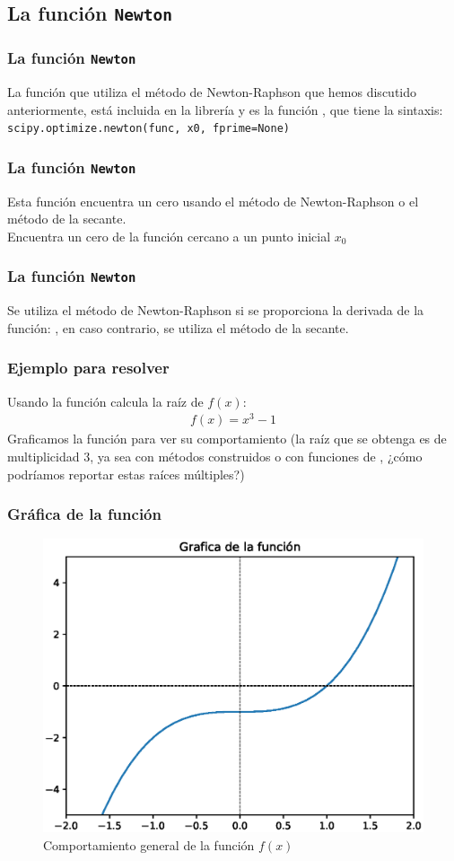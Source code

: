 \subsection{La función \texttt{Newton}}
\begin{frame}[fragile]
\frametitle{La función \texttt{Newton}}
La función que utiliza el método de Newton-Raphson que hemos discutido anteriormente, está incluida en la librería  y es la función , que tiene la sintaxis:
\\
\bigskip
\verb|scipy.optimize.newton(func, x0, fprime=None)|
\end{frame}
\begin{frame}[fragile]
\frametitle{La función \texttt{Newton}}
Esta función encuentra un cero usando el método de Newton-Raphson o el método de la secante.
\\
\bigskip
Encuentra un cero de la función  cercano a un punto inicial $x_{0}$
\end{frame}
\begin{frame}[fragile]
\frametitle{La función \texttt{Newton}}
Se utiliza el método de Newton-Raphson si se proporciona la derivada de la función: , en caso contrario, se utiliza el método de la secante.
\end{frame}
\begin{frame}
\frametitle{Ejemplo para resolver}
Usando la función  calcula la raíz de $f(x)$:
\begin{align*}
f(x) = x^{3} - 1
\end{align*}
Graficamos la función para ver su comportamiento (la raíz que se obtenga es de multiplicidad 3, ya sea con métodos construidos o con funciones de \python, ¿cómo podríamos reportar estas raíces múltiples?)
\end{frame}
\begin{frame}
\frametitle{Gráfica de la función}
\begin{figure}[h!]
    \centering
    \includegraphics[scale=0.5]{Imagenes/raices_scipy_newton_01.eps}
    \caption{Comportamiento general de la función $f(x)$}
\end{figure}
\end{frame}
